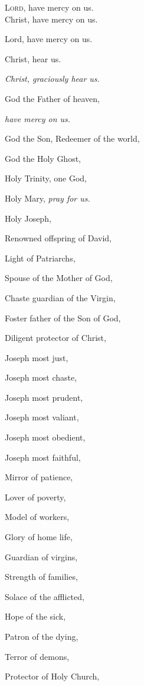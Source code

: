 \newHymn

\JustHymnNum
{}

\begin{multicols}{2}

\lettrine{L}{ord,} have mercy on us.\\
Christ, have mercy on us.\\
\begin{hangparas}{1em}{1}
\parskip0mm
\raggedright
Lord, have mercy on us.

Christ, hear us.

{\itshape Christ, graciously hear us.}

God the Father of heaven,

{\itshape have mercy on us.}

God the Son, Redeemer of the world,

God the Holy Ghost,

Holy Trinity, one God,

Holy Mary, \textit{pray for us.}

Holy Joseph,

Renowned offspring of David,

Light of Patriarchs,

Spouse of the Mother of God,

Chaste guardian of the Virgin,

Foster father of the Son of God,

Diligent protector of Christ,


Joseph most just,

Joseph most chaste,

Joseph most prudent,

Joseph most valiant,

Joseph most obedient,

Joseph most faithful,

Mirror of patience,

Lover of poverty,

Model of workers,

Glory of home life,

Guardian of virgins,

Strength of families,

Solace of the afflicted,

Hope of the sick,

Patron of the dying,

Terror of demons,

Protector of Holy Church,

\end{hangparas}

\end{multicols}

